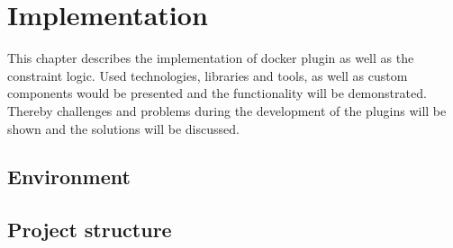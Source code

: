 \acresetall

\chapter{Implementation}\label{chapter:implementation}
This chapter describes the implementation of docker plugin as well as the constraint logic.
Used technologies, libraries and tools, as well as custom components would be presented and the functionality will be demonstrated.
Thereby challenges and problems during the development of the plugins will be shown and the solutions will be discussed.

\section{Environment}
\doit

\section{Project structure}

